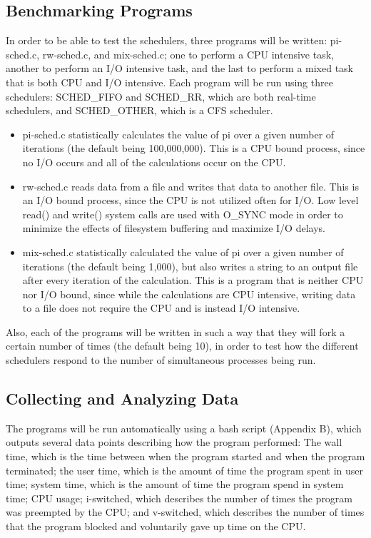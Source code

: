 \documentclass[12pt]{article}
\begin{document}
\subsection{Benchmarking Programs}
In order to be able to test the schedulers, three programs will be written: 
{\ttfamily pi-sched.c, rw-sched.c,} and {\ttfamily mix-sched.c}; one to perform
a CPU intensive task, another to perform an I/O intensive task, and the last to 
perform a mixed task that is both CPU and I/O intensive. Each program will be 
run using three schedulers: SCHED\_FIFO and SCHED\_RR, which are both real-time
schedulers, and SCHED\_OTHER, which is a CFS scheduler.

\begin{itemize}
\item {\ttfamily pi-sched.c} statistically calculates the value of pi over a 
given number of iterations (the default being 100,000,000). This is a CPU bound 
process, since no I/O occurs and all of the calculations occur on the CPU.
\item {\ttfamily rw-sched.c} reads data from a file and writes that data to 
another file. This is an I/O bound process, since the CPU is not utilized often
for I/O. Low level {\ttfamily read()} and {\ttfamily write()} system calls are
used with {\ttfamily O\_SYNC} mode in order to minimize the effects of filesystem
buffering and maximize I/O delays.
\item {\ttfamily mix-sched.c} statistically calculated the value of pi over a
given number of iterations (the default being 1,000), but also writes a string
to an output file after every iteration of the calculation. This is a program 
that is neither CPU nor I/O bound, since while the calculations are CPU 
intensive, writing data to a file does not require the CPU and is instead I/O
intensive.
\end{itemize}

Also, each of the programs will be written in such a way that they will fork a 
certain number of times (the default being 10), in order to test how the 
different schedulers respond to the number of simultaneous processes being run.

\subsection{Collecting and Analyzing Data}
The programs will be run automatically using a bash script (Appendix B), which
outputs several data points describing how the program performed: The wall time,
which is the time between when the program started and when the program 
terminated; the user time, which is the amount of time the program spent in user
time; system time, which is the amount of time the program spend in system time;
CPU usage; i-switched, which describes the number of times the program was 
preempted by the CPU; and v-switched, which describes the number of times that 
the program blocked and voluntarily gave up time on the CPU.
\end{document}
